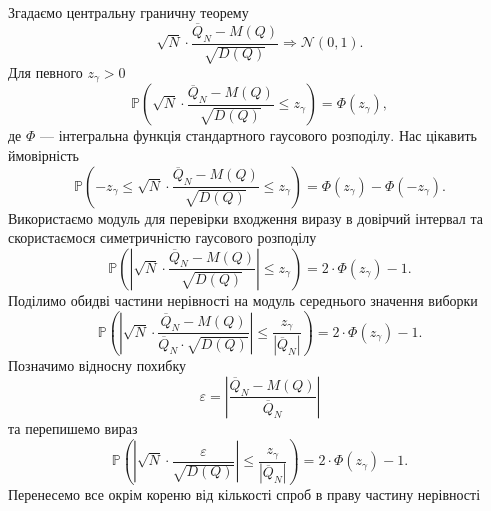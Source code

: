 Згадаємо центральну граничну теорему
\begin{equation*}
  \sqrt{N}
    \cdot \frac{\overline{Q}_N - M\left( Q \right)}
    {\sqrt{D\left( Q \right)}} \Rightarrow \mathcal{N}\left( 0, 1 \right).
\end{equation*}
Для певного $z_{\gamma} > 0$
\begin{equation*}
  \mathbb{P}\left(
    \sqrt{N}
    \cdot \frac{\overline{Q}_N - M\left( Q \right)}{\sqrt{D\left( Q \right)}}
    \le z_{\gamma}
  \right) = \Phi\left( z_{\gamma} \right),
\end{equation*}
де $\Phi$ --- інтегральна функція стандартного гаусового розподілу.
Нас цікавить ймовірність
\begin{equation*}
  \mathbb{P}\left(
    -z_{\gamma} \le
    \sqrt{N}
    \cdot \frac{\overline{Q}_N - M\left( Q \right)}{\sqrt{D\left( Q \right)}}
    \le z_{\gamma}
  \right)
  = \Phi\left( z_{\gamma} \right) - \Phi\left( -z_{\gamma} \right).
\end{equation*}
Використаємо модуль для перевірки входження виразу в довірчий інтервал
та скористаємося симетричністю гаусового розподілу
\begin{equation*}
  \mathbb{P}\left(
    \left|
      \sqrt{N}
      \cdot \frac{\overline{Q}_N - M\left( Q \right)}{\sqrt{D\left( Q \right)}}
    \right|
    \le z_{\gamma}
  \right)
  = 2 \cdot \Phi\left( z_{\gamma} \right) - 1.
\end{equation*}
Поділимо обидві частини нерівності на модуль середнього значення виборки
\begin{equation*}
  \mathbb{P}\left(
    \left|
      \sqrt{N}
      \cdot \frac{\overline{Q}_N - M\left( Q \right)}
        {\overline{Q}_N \cdot \sqrt{D\left( Q \right)}}
    \right|
    \le \frac{z_{\gamma}}{\left| \overline{Q}_N \right|}
  \right)
  = 2 \cdot \Phi\left( z_{\gamma} \right) - 1.
\end{equation*}
Позначимо відносну похибку
\begin{equation*}
  \varepsilon
  = \left| \frac{\overline{Q}_N - M\left( Q \right)}{\overline{Q}_N} \right|
\end{equation*}
та перепишемо вираз
\begin{equation*}
  \mathbb{P}\left(
    \left|
      \sqrt{N}
      \cdot \frac{\varepsilon}
        {\sqrt{D\left( Q \right)}}
    \right|
    \le \frac{z_{\gamma}}{\left| \overline{Q}_N \right|}
  \right)
  = 2 \cdot \Phi\left( z_{\gamma} \right) - 1.
\end{equation*}
Перенесемо все окрім кореню від кількості спроб в праву частину нерівності
